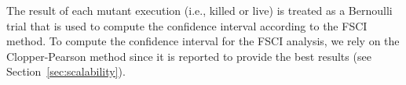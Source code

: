 { The result of each mutant execution (i.e., killed or live) is treated as a Bernoulli trial that is used to compute the confidence interval according to the FSCI method.
To compute the confidence interval for the FSCI analysis, we rely on the Clopper-Pearson method since it is reported to provide the best results (see Section~\ref{sec:scalability}).
%
%
}
